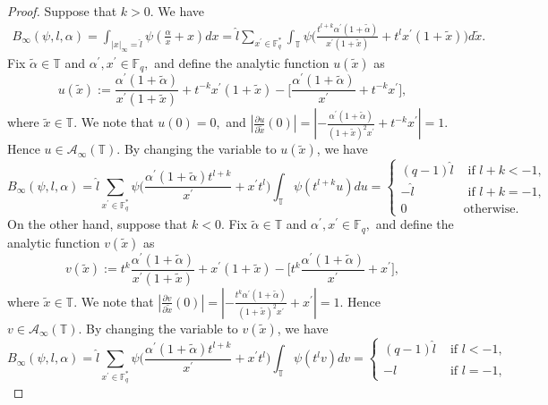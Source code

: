 \documentclass[11pt]{amsart}
\theoremstyle{plain}
\theoremstyle{plain}
\theoremstyle{remark}
\theoremstyle{definition}
\newcommand{\hl}{\widehat l}
\newcommand{\FF}{\mathbb{F}}
\newcommand{\TT}{\mathbb{T}}
\newcommand{\cA}{\mathcal{A}}
\begin{document}
\begin{proof}
Suppose that $k>0$.  We have 
\begin{equation*}
\begin{split}
B_{\infty}(\psi,l,\alpha)=\int_{|x|_{\infty}=\hl} \psi(\frac{\alpha}{ x}+x)dx=\hl \sum_{x^{\prime}\in \FF_q^{*}} \int_{\TT} \psi\Big(\frac{ t^{l+k}\alpha^{\prime} (1+\tilde{\alpha})}{x^{\prime}(1+\tilde{x})} + t^lx^{\prime}(1+\tilde{x}) \Big) d\tilde{x}.
\end{split}
\end{equation*}
Fix $\tilde{\alpha}\in \TT $ and $\alpha^{\prime}, x^{\prime} \in \FF_q,$ and define the analytic function $u(\tilde{x})$ as 
\[
u(\tilde{x}):=\frac{ \alpha^{\prime} (1+\tilde{\alpha})}{x^{\prime}(1+\tilde{x})} + t^{-k}x^{\prime}(1+\tilde{x})- \big[  \frac{ \alpha^{\prime} (1+\tilde{\alpha})}{x^{\prime}} + t^{-k}x^{\prime} \big], 
\]
where $\tilde{x}\in\TT.$ We note that $u(0)=0,$ and  $|\frac{\partial u}{\partial \tilde{x}}(0)|=|-\frac{ \alpha^{\prime} (1+\tilde{\alpha})}{(1+\tilde{x})^2x^{\prime}} + t^{-k}x^{\prime}|=1.$ Hence    $u\in \cA_{\infty}(\TT).$
By changing the variable to $u(\tilde{x})$, we have 
\[
B_{\infty}(\psi,l,\alpha)=\hl \sum_{x^{\prime}\in \FF_q^{*}}  \psi\Big(\frac{\alpha^{\prime} (1+\tilde{\alpha}) t^{l+k}}{x^{\prime}}+x^{\prime}t^{l} \Big)  \int_{\TT} \psi( t^{l+k}u)du=\begin{cases} 
(q-1)\hl &\text{ if } l+k<-1,
\\
-\hl &\text{ if } l+k=-1,
\\
0   &\text{otherwise.} \end{cases}
\]
On the other hand, suppose that  $k<0$. 
Fix $\tilde{\alpha}\in \TT $ and $\alpha^{\prime}, x^{\prime} \in \FF_q,$ and define the analytic function $v(\tilde{x})$ as 
\[
v(\tilde{x}):=t^{k}\frac{ \alpha^{\prime} (1+\tilde{\alpha})}{x^{\prime}(1+\tilde{x})} + x^{\prime}(1+\tilde{x})- \big[ t^{k}  \frac{ \alpha^{\prime} (1+\tilde{\alpha})}{x^{\prime}} +x^{\prime} \big], 
\]
where $\tilde{x}\in\TT.$ We note that $|\frac{\partial v}{\partial \tilde{x}}(0)|=|-\frac{ t^{k}\alpha^{\prime} (1+\tilde{\alpha})}{(1+\tilde{x})^2x^{\prime}} + x^{\prime}|=1.$ Hence    $v\in \cA_{\infty}(\TT).$
By changing the variable to $v(\tilde{x})$, we have 
\[
B_{\infty}(\psi,l,\alpha)=\hl \sum_{x^{\prime}\in \FF_q^{*}}  \psi\Big(\frac{\alpha^{\prime} (1+\tilde{\alpha}) t^{l+k}}{x^{\prime}}+x^{\prime}t^{l} \Big)  \int_{\TT} \psi( t^{l}v)dv=\begin{cases} 
(q-1)\hl &\text{ if } l<-1,
\\
-\hl &\text{ if } l=-1,

\end{cases}\]
\end{proof}
\end{document}
